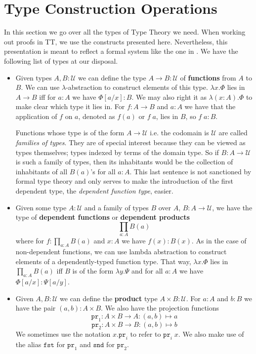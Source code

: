 \documentclass[12pt]{report}
\theoremstyle{definition}
\begin{document}
\section{Type Construction Operations}\label{informalTT}
In this section we go over all the types of Type Theory we need. 
When working out proofs in TT, we use the constructs presented here. 
Nevertheless, this presentation is meant to reflect a formal system like the one in . 
We have the following list of types at our disposal.
\begin{itemize}
	\item Given types $A, B : \mathcal{U}$ we can define the type $A \rightarrow B : \mathcal{U}$ of \textbf{functions} from $A$ to $B$. 
		We can use $\lambda$-abstraction to construct elements of this type. $\lambda x. \Phi$ lies in $A \rightarrow B$ iff for $a : A$ we have $\Phi[a/x] : B$. 
		We may also right it as $\lambda (x : A). \Phi$ to make clear which type it lies in. 
		For $f : A \rightarrow B$ and $a : A$ we have that the application of $f$ on $a$, denoted as $f(a)$ or $f\;a$, lies in $B$, so $f\;a : B$. 

		Functions whose type is of the form $A \rightarrow \mathcal{U}$ i.e. the codomain is $\mathcal{U}$ are called \textit{families of types}. 
		They are of special interest because they can be viewed as types themselves; types indexed by terms of the domain type. 
		So if $B : A \rightarrow \mathcal{U}$ is such a family of types, then its inhabitants would be the collection of inhabitants of all $B(a)$'s for all $a  : A$. 
		This last sentence is not sanctioned by formal type theory and only serves to make the introduction of the first dependent type, the \textit{dependent function type}, easier.
	\item Given some type $A : \mathcal{U}$ and a family of types $B$ over $A$, $B : A \rightarrow \mathcal{U}$, we have the type of \textbf{dependent functions} or \textbf{dependent products} $$\prod_{a : A} B(a)$$
	where for $f : \prod_{a : A} B(a)$ and $x : A$ we have $f(x) : B(x)$. 
	As in the case of non-dependent functions, we can use lambda abstraction to construct elements of a dependently-typed function type. 
	That way, $\lambda x.\Phi$ lies in $\prod_{a:A}B(a)$ iff $B$ is of the form $\lambda y.\Psi$ and for all $a:A$ we have $\Phi[a/x] : \Psi[a/y]$. 
	\item Given $A, B : \mathcal{U}$ we can define the \textbf{product} type $A \times B : \mathcal{U}$. 
	For $a : A$ and $b : B$ we have the pair $(a,b) : A \times B$. 
	We also have the projection functions 
	$$\mathtt{pr}_1 : A \times B \rightarrow A : (a,b) \mapsto a$$
	$$\mathtt{pr}_2 : A \times B \rightarrow B : (a,b) \mapsto b$$
	We sometimes use the notation $x.\mathtt{pr}_i$ to refer to $\mathtt{pr}_i\; x$. 
	We also make use of the alias $\mathtt{fst}$ for $\mathtt{pr}_1$ and $\mathtt{snd}$ for $\mathtt{pr}_2$. 


\end{itemize}
\end{document}
